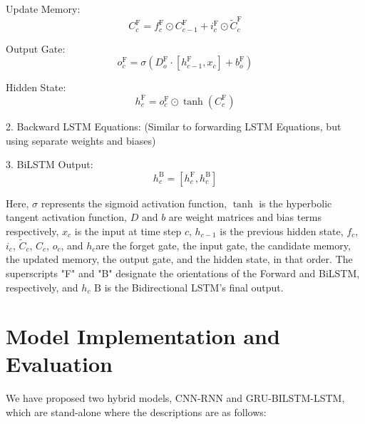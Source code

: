 \documentclass[a4paper,fleqn]{cas-sc}
\begin{document}
Update Memory:
\begin{equation}
C_c^{\text{F}} = f_c^{\text{F}} \odot C_{c-1}^{\text{F}} + i_c^{\text{F}} \odot \tilde{C}_c^{\text{F}}
\end{equation}

Output Gate:
\begin{equation}
o_c^{\text{F}} = \sigma(D_o^{\text{F}} \cdot [h_{c-1}^{\text{F}}, x_c] + b_o^{\text{F}})
\end{equation}

Hidden State:
\begin{equation}
h_c^{\text{F}} = o_c^{\text{F}} \odot \tanh(C_c^{\text{F}})
\end{equation}

2. Backward LSTM Equations:
(Similar to forwarding LSTM Equations, but using separate weights and biases)

3. BiLSTM Output:
\begin{equation}
h_c^{\text{B}} = [h_c^{\text{F}}, h_c^{\text{B}}]
\end{equation}

Here, $\sigma$ represents the sigmoid activation function, $\tanh$ is the hyperbolic tangent activation function, $D$ and $b$ are weight matrices and bias terms respectively, $x_c$ is the input at time step $c$, $h_{c-1}$ is the previous hidden state, $f_c$, $i_c$, $\tilde{C}_c$, $C_c$, $o_c$, and $h_c$are the forget gate, the input gate, the candidate memory, the updated memory, the output gate, and the hidden state, in that order. The superscripts "F" and "B" designate the orientations of the Forward and BiLSTM, respectively, and $h_c\text{ B}$ is the Bidirectional LSTM's final output.





\section{Model Implementation and Evaluation}

We have proposed two hybrid models, CNN-RNN and GRU-BILSTM-LSTM, which are stand-alone where the descriptions are as follows:
\end{document}
